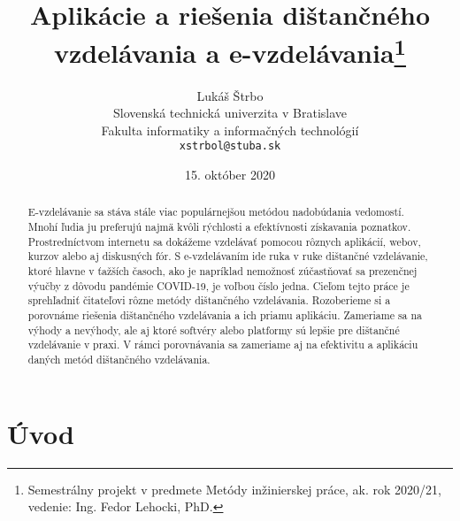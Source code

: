 \documentclass[10pt,twoside,slovak,a4paper]{article}
\title{Aplikácie a riešenia dištančného vzdelávania a e-vzdelávania\thanks{Semestrálny projekt v predmete Metódy inžinierskej práce, ak. rok 2020/21, vedenie: Ing. Fedor Lehocki, PhD.}}
\author{Lukáš Štrbo\\[2pt]
	{\small Slovenská technická univerzita v Bratislave}\\
	{\small Fakulta informatiky a informačných technológií}\\
	{\small \texttt{xstrbol@stuba.sk}}
	}
\date{\small 15. október 2020}
\begin{document}
\maketitle

\begin{abstract}
E-vzdelávanie sa stáva stále viac populárnejšou metódou nadobúdania vedomostí. Mnohí ľudia ju preferujú najmä kvôli rýchlosti a efektívnosti získavania poznatkov.
Prostredníctvom internetu sa dokážeme vzdelávať pomocou rôznych aplikácií, webov, kurzov alebo aj diskusných fór.
S e-vzdelávaním ide ruka v ruke dištančné vzdelávanie, ktoré hlavne v ťažších časoch, ako je napríklad nemožnosť zúčastňovať sa prezenčnej výučby z dôvodu pandémie COVID-19, 
 je voľbou číslo jedna. Cieľom tejto práce je sprehľadniť čitateľovi rôzne metódy dištančného vzdelávania. Rozoberieme si a porovnáme riešenia dištančného vzdelávania a ich priamu
 aplikáciu. Zameriame sa na výhody a nevýhody, ale aj ktoré softvéry alebo platformy sú lepšie pre dištančné vzdelávanie v praxi. 
 V rámci porovnávania sa zameriame aj na efektivitu a aplikáciu daných metód dištančného vzdelávania.
\end{abstract}



\section{Úvod}






\end{document}
